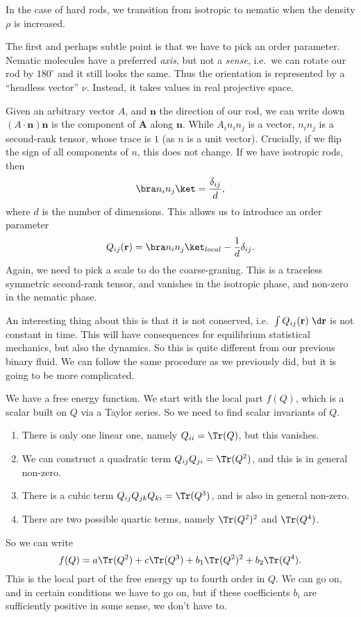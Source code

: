 \documentclass[a4paper]{article}
\begin{document}
In the case of hard rods, we transition from isotropic to nematic when the density $\rho$ is increased.

The first and perhaps subtle point is that we have to pick an order parameter. Nematic molecules have a preferred \emph{axis}, but not a \emph{sense}, i.e.\ we can rotate our rod by $180^\circ$ and it still looks the same. Thus the orientation is represented by a ``headless vector'' $\nu$. Instead, it takes values in real projective space.

Given an arbitrary vector $A$, and $\mathbf{n}$ the direction of our rod, we can write down $(A \cdot \mathbf{n}) \mathbf{n}$ is the component of $\mathbf{A}$ along $\mathbf{n}$. While $A_i n_i n_j$ is a vector, $n_i n_j$ is a second-rank tensor, whose trace is $1$ (as $n$ is a unit vector). Crucially, if we flip the sign of all components of $n$, this does not change. If we have isotropic rods, then
\[
  \bra n_i n_j \ket = \frac{\delta_{ij}}{d},
\]
where $d$ is the number of dimensions. This allows us to introduce an order parameter
\[
  Q_{ij} (\mathbf{r}) = \bra n_i n_j\ket_{local} - \frac{1}{d} \delta_{ij}.
\]
Again, we need to pick a scale to do the coarse-graning. This is a traceless symmetric second-rank tensor, and vanishes in the isotropic phase, and non-zero in the nematic phase.

An interesting thing about this is that it is not conserved, i.e.\ $\int Q_{ij}(\mathbf{r})\;\d \mathbf{r}$ is not constant in time. This will have consequences for equilibrium statistical mechanics, but also the dynamics. So this is quite different from our previous binary fluid. We can follow the same procedure as we previously did, but it is going to be more complicated.

We have a free energy function. We start with the local part $f(Q)$, which is a scalar built on $Q$ via a Taylor series. So we need to find scalar invariants of $Q$.
\begin{enumerate}
  \item There is only one linear one, namely $Q_{ii} = \Tr(Q)$, but this vanishes.
  \item We can construct a quadratic term $Q_{ij} Q_{ji} = \Tr(Q^2)$, and this is in general non-zero.
  \item There is a cubic term $Q_{ij} Q_{jk} Q_{ki} = \Tr(Q^3)$, and is also in general non-zero.
  \item There are two possible quartic terms, namely $\Tr(Q^2)^2$ and $\Tr(Q^4)$.
\end{enumerate}
So we can write
\[
  f(Q) = a\Tr(Q^2) + c \Tr(Q^3) + b_1 \Tr(Q^2)^2 + b_2 \Tr(Q^4).
\]
This is the local part of the free energy up to fourth order in $Q$. We can go on, and in certain conditions we have to go on, but if these coefficients $b_i$ are sufficiently positive in some sense, we don't have to.
\end{document}
